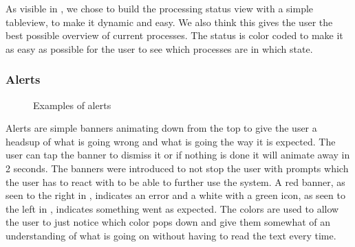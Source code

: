 As visible in , we chose to build the processing status view with a simple tableview, to make it dynamic and easy. We also think this gives the user the best possible overview of current processes. The status is color coded to make it as easy as possible for the user to see which processes are in which state.

\subsubsection{Alerts}
\begin{figure}[ht]
\caption{Examples of alerts}
\label{fig:ios_alerts}
\end{figure}
\FloatBarrier

Alerts are simple banners animating down from the top to give the user a headsup of what is going wrong and what is going the way it is expected. The user can tap the banner to dismiss it or if nothing is done it will animate away in 2 seconds. The banners were introduced to not stop the user with prompts which the user has to react with to be able to further use the system. A red banner, as seen to the right in , indicates an error and a white with a green icon, as seen to the left in , indicates something went as expected. The colors are used to allow the user to just notice which color pops down and give them somewhat of an understanding of what is going on without having to read the text every time. 
